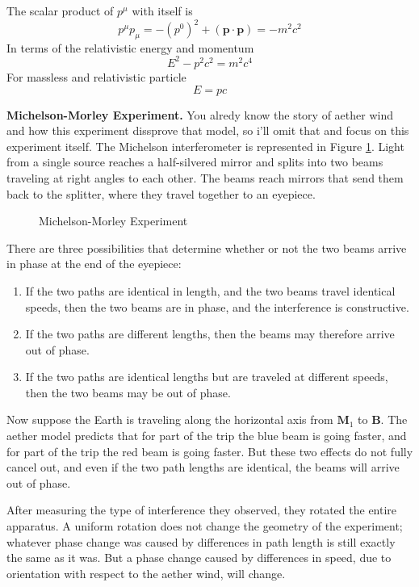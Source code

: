 \documentclass[../../main.tex]{subfiles}
\begin{document}
The scalar product of $p^\mu$ with itself is
\begin{equation*}
    p^\mu p_\mu=-(p^0)^2+(\mathbf{p}\cdot\mathbf{p})=-m^2c^2
\end{equation*}
In terms of the relativistic energy and momentum
\begin{equation*}
    E^2-p^2c^2=m^2c^4
\end{equation*}
For massless and relativistic particle
\begin{equation*}
    E=pc
\end{equation*}

\textbf{Michelson-Morley Experiment.} You alredy know the story of aether wind and how this experiment dissprove that model, so i'll omit that and focus on this experiment itself. The Michelson interferometer is represented in Figure \ref{fig:MMExperiment1}. Light from a single source reaches a half-silvered mirror and splits into two beams traveling at right angles to each other. The beams reach mirrors that send them back to the splitter, where they travel together to an eyepiece.
\begin{figure}
    \centering
    \caption{Michelson-Morley Experiment}
    \label{fig:MMExperiment1}
\end{figure}
There are three possibilities that determine whether or not the two beams arrive in phase at the end of the eyepiece:
\begin{enumerate}
    \item If the two paths are identical in length, and the two beams travel identical speeds, then
    the two beams are in phase, and the interference is constructive.
    \item If the two paths are different lengths, then the beams may therefore arrive out of phase.
    \item If the two paths are identical lengths but are traveled at different speeds, then the two beams may be out of phase.
\end{enumerate}
Now suppose the Earth is traveling along the horizontal axis from $\mathbf{M}_1$ to \textbf{B}. The aether model predicts that for part of the trip the blue beam is going faster, and for part of the trip the red beam is going faster. But these two effects do not fully cancel out, and even if the two path lengths are identical, the beams will arrive out of phase.

After measuring the type of interference they observed, they rotated the entire apparatus. A uniform rotation does not change the geometry of the experiment; whatever phase change was caused by differences in path length is still exactly the same as it was. But a phase change caused by differences in speed, due to orientation with respect to the aether wind, will change. 
\end{document}
